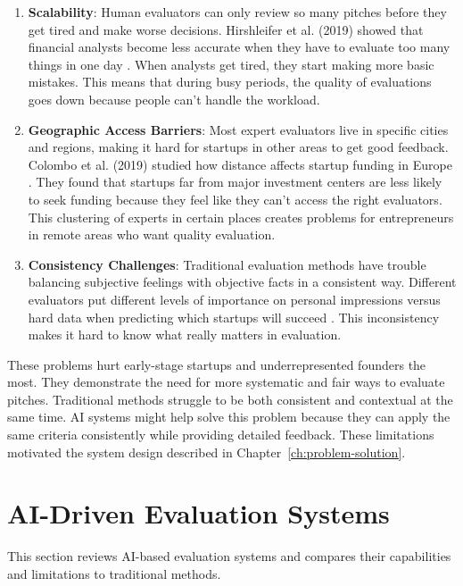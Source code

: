 \begin{enumerate}
    \item \textbf{Scalability}: Human evaluators can only review so many pitches before they get tired and make worse decisions. Hirshleifer et al. (2019) showed that financial analysts become less accurate when they have to evaluate too many things in one day \cite{Hirshleifer2019}. When analysts get tired, they start making more basic mistakes. This means that during busy periods, the quality of evaluations goes down because people can't handle the workload.

    \item \textbf{Geographic Access Barriers}: Most expert evaluators live in specific cities and regions, making it hard for startups in other areas to get good feedback. Colombo et al. (2019) studied how distance affects startup funding in Europe \cite{Colombo2019}. They found that startups far from major investment centers are less likely to seek funding because they feel like they can't access the right evaluators. This clustering of experts in certain places creates problems for entrepreneurs in remote areas who want quality evaluation.

    \item \textbf{Consistency Challenges}: Traditional evaluation methods have trouble balancing subjective feelings with objective facts in a consistent way. Different evaluators put different levels of importance on personal impressions versus hard data when predicting which startups will succeed \cite{Tsay2021VISUALSDI}. This inconsistency makes it hard to know what really matters in evaluation.
\end{enumerate}

These problems hurt early-stage startups and underrepresented founders the most. They demonstrate the need for more systematic and fair ways to evaluate pitches. Traditional methods struggle to be both consistent and contextual at the same time. AI systems might help solve this problem because they can apply the same criteria consistently while providing detailed feedback. These limitations motivated the system design described in Chapter~\ref{ch:problem-solution}.

\section{AI-Driven Evaluation Systems}
\label{sec:ai-systems}

This section reviews AI-based evaluation systems and compares their capabilities and limitations to traditional methods.

